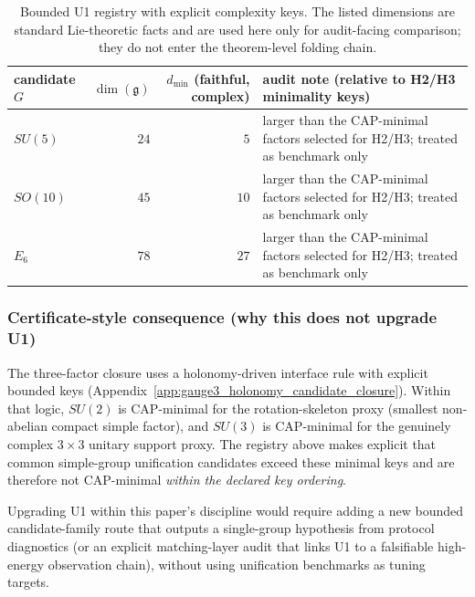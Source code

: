 \begin{table}[t]
\centering
\small
\setlength{\tabcolsep}{10pt}
\renewcommand{\arraystretch}{1.15}
\begin{tabular}{lrrp{}}
\toprule
candidate $G$ & $\dim(\mathfrak{g})$ & $d_{\min}$ (faithful, complex) & audit note (relative to H2/H3 minimality keys) \\
\midrule
$SU(5)$ & $24$ & $5$ & larger than the CAP-minimal factors selected for H2/H3; treated as benchmark only \\
$SO(10)$ & $45$ & $10$ & larger than the CAP-minimal factors selected for H2/H3; treated as benchmark only \\
$E_6$ & $78$ & $27$ & larger than the CAP-minimal factors selected for H2/H3; treated as benchmark only \\
\bottomrule
\end{tabular}
\caption{Bounded U1 registry with explicit complexity keys. The listed dimensions are standard Lie-theoretic facts and are used here only for audit-facing comparison; they do not enter the theorem-level folding chain.}
\label{tab:u1_simple_group_registry}
\end{table}

\subsubsection{Certificate-style consequence (why this does not upgrade U1)}
\AuditTag The three-factor closure uses a holonomy-driven interface rule with explicit bounded keys (Appendix~\ref{app:gauge3_holonomy_candidate_closure}).
Within that logic, $SU(2)$ is CAP-minimal for the rotation-skeleton proxy (smallest non-abelian compact simple factor), and $SU(3)$ is CAP-minimal for the genuinely complex $3\times 3$ unitary support proxy.
The registry above makes explicit that common simple-group unification candidates exceed these minimal keys and are therefore not CAP-minimal \emph{within the declared key ordering}.
\par
\AuditTag Upgrading U1 within this paper's discipline would require adding a new bounded candidate-family route that outputs a single-group hypothesis from protocol diagnostics (or an explicit matching-layer audit that links U1 to a falsifiable high-energy observation chain), without using unification benchmarks as tuning targets.
